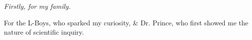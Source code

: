 {
\centering
\it Firstly, for my family.

For the L-Boys, who sparked my curiosity, 
\& Dr. Prince, who first showed me the nature of scientific inquiry.
\par
}

\vspace{0.25\textheight}



